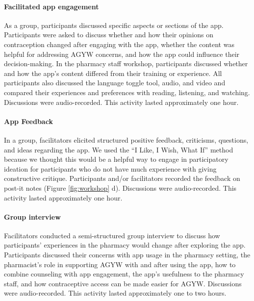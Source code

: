 \paragraph{Facilitated app engagement}
As a group, participants discussed specific aspects or sections of the app. Participants were asked to discuss whether and how their opinions on contraception changed after engaging with the app, whether the content was helpful for addressing AGYW concerns, and how the app could influence their decision-making. In the pharmacy staff workshop, participants  discussed whether and how the app’s content differed from their training or experience. All participants also discussed the language toggle tool, audio, and video and compared their experiences and preferences with reading, listening, and watching. Discussions were audio-recorded.  This activity lasted approximately one hour.

\paragraph{App Feedback}
In a group, facilitators elicited structured positive feedback, criticisms, questions, and ideas regarding the app. We used the “I Like, I Wish, What If” method ~\cite{Dam_Siang_2023} because we thought this would be a helpful way to engage in participatory ideation for participants who do not have much experience with giving constructive critique. %
Participants and/or facilitators recorded the feedback on post-it notes (Figure \ref{fig:workshop} d). Discussions were audio-recorded.  This activity lasted approximately one hour.


\paragraph{Group interview}
Facilitators conducted a semi-structured group interview to discuss how participants’ experiences in the pharmacy would change after exploring the app. Participants discussed their concerns with app usage in the pharmacy setting, the pharmacist’s role in supporting AGYW with and after using the app, how to combine counseling with app engagement, the app’s usefulness to the pharmacy staff, and how contraceptive access can be made easier for AGYW. Discussions were audio-recorded.  This activity lasted approximately one to two hours. 


